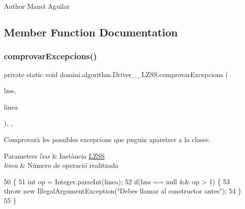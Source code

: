 \begin{DoxyAuthor}{Author}
Manel Aguilar 
\end{DoxyAuthor}


\subsection{Member Function Documentation}
\mbox{\label{classdomini_1_1algorithm_1_1Driver____LZSS_a3b1983c6a71cd4d510e8434cd2e7f8f2}} 
\subsubsection{\texorpdfstring{comprovar\+Excepcions()}{comprovarExcepcions()}}
{\footnotesize\ttfamily private static void domini.\+algorithm.\+Driver\+\_\+\+\_\+\+L\+Z\+S\+S.\+comprovar\+Excepcions (\begin{DoxyParamCaption}\item[{\hyperlink{classdomini_1_1algorithm_1_1LZSS}{L\+Z\+SS}}]{lzss,  }\item[{String}]{linea }\end{DoxyParamCaption})\hspace{0.3cm}{\ttfamily [inline]}, {\ttfamily [static]}, {\ttfamily [private]}}



Comprovarà les possibles excepcions que puguin apareixer a la classe. 


\begin{DoxyParams}{Parameters}
{\em lzss} & Instància \hyperlink{classdomini_1_1algorithm_1_1LZSS}{L\+Z\+SS} \\
\hline
{\em linea} & Número de operació realitzada \\
\hline
\end{DoxyParams}

\begin{DoxyCode}
50                                                                     \{
51         \textcolor{keywordtype}{int} op = Integer.parseInt(linea);
52         \textcolor{keywordflow}{if}(lzss == null && op > 1) \{
53             \textcolor{keywordflow}{throw} \textcolor{keyword}{new} IllegalArgumentException(\textcolor{stringliteral}{"Debes llamar al constructor antes"});
54         \}
55     \}
\end{DoxyCode}
\mbox{\label{classdomini_1_1algorithm_1_1Driver____LZSS_ac1b8e15e184e7372a5ad2a76ac3b5d8c}} 
